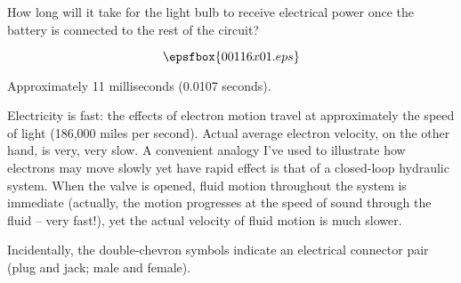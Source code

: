 

How long will it take for the light bulb to receive electrical power once the battery is connected to the rest of the circuit?

$$\epsfbox{00116x01.eps}$$







Approximately 11 milliseconds (0.0107 seconds).







Electricity is fast: the effects of electron motion travel at approximately the speed of light (186,000 miles per second).  Actual average electron velocity, on the other hand, is very, very slow.  A convenient analogy I've used to illustrate how electrons may move slowly yet have rapid effect is that of a closed-loop hydraulic system.  When the valve is opened, fluid motion throughout the system is immediate (actually, the motion progresses at the speed of sound through the fluid -- very fast!), yet the actual velocity of fluid motion is much slower.

Incidentally, the double-chevron symbols indicate an electrical connector pair (plug and jack; male and female).




